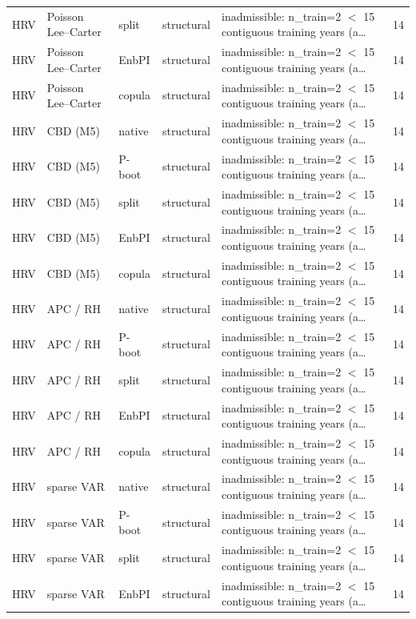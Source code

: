 {\begin{longtable}{@{}lllp{1.6cm}p{6.2cm}r@{}}
HRV & Poisson Lee--Carter & split & structural & inadmissible: n\_train=2 $<$ 15 contiguous training years (a\ldots & 14 \\
HRV & Poisson Lee--Carter & EnbPI & structural & inadmissible: n\_train=2 $<$ 15 contiguous training years (a\ldots & 14 \\
HRV & Poisson Lee--Carter & copula & structural & inadmissible: n\_train=2 $<$ 15 contiguous training years (a\ldots & 14 \\
HRV & CBD (M5) & native & structural & inadmissible: n\_train=2 $<$ 15 contiguous training years (a\ldots & 14 \\
HRV & CBD (M5) & P-boot & structural & inadmissible: n\_train=2 $<$ 15 contiguous training years (a\ldots & 14 \\
HRV & CBD (M5) & split & structural & inadmissible: n\_train=2 $<$ 15 contiguous training years (a\ldots & 14 \\
HRV & CBD (M5) & EnbPI & structural & inadmissible: n\_train=2 $<$ 15 contiguous training years (a\ldots & 14 \\
HRV & CBD (M5) & copula & structural & inadmissible: n\_train=2 $<$ 15 contiguous training years (a\ldots & 14 \\
HRV & APC / RH & native & structural & inadmissible: n\_train=2 $<$ 15 contiguous training years (a\ldots & 14 \\
HRV & APC / RH & P-boot & structural & inadmissible: n\_train=2 $<$ 15 contiguous training years (a\ldots & 14 \\
HRV & APC / RH & split & structural & inadmissible: n\_train=2 $<$ 15 contiguous training years (a\ldots & 14 \\
HRV & APC / RH & EnbPI & structural & inadmissible: n\_train=2 $<$ 15 contiguous training years (a\ldots & 14 \\
HRV & APC / RH & copula & structural & inadmissible: n\_train=2 $<$ 15 contiguous training years (a\ldots & 14 \\
HRV & sparse VAR & native & structural & inadmissible: n\_train=2 $<$ 15 contiguous training years (a\ldots & 14 \\
HRV & sparse VAR & P-boot & structural & inadmissible: n\_train=2 $<$ 15 contiguous training years (a\ldots & 14 \\
HRV & sparse VAR & split & structural & inadmissible: n\_train=2 $<$ 15 contiguous training years (a\ldots & 14 \\
HRV & sparse VAR & EnbPI & structural & inadmissible: n\_train=2 $<$ 15 contiguous training years (a\ldots & 14 \\

\end{longtable}}
